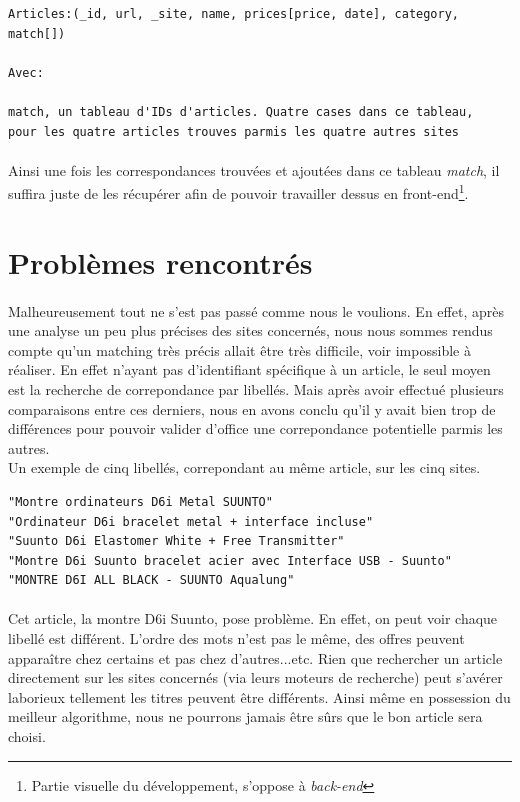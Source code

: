 \documentclass{report}
\begin{document}
\begin{lstlisting}
Articles:(_id, url, _site, name, prices[price, date], category, match[])

Avec:

match, un tableau d'IDs d'articles. Quatre cases dans ce tableau, 
pour les quatre articles trouves parmis les quatre autres sites

\end{lstlisting}

\paragraph{}
Ainsi une fois les correspondances trouvées et ajoutées dans ce tableau \textit{match}, il suffira juste de les récupérer afin de pouvoir travailler dessus en front-end\footnote{Partie visuelle du développement, s'oppose à \textit{back-end}}.


\section{Problèmes rencontrés}

\paragraph{}
Malheureusement tout ne s'est pas passé comme nous le voulions. En effet, après une analyse un peu plus précises des sites concernés, nous nous sommes rendus compte qu'un matching très précis allait être très difficile, voir impossible à réaliser. En effet n'ayant pas d'identifiant spécifique à un article, le seul moyen est la recherche de correpondance par libellés. Mais après avoir effectué plusieurs comparaisons entre ces derniers, nous en avons conclu qu'il y avait bien trop de différences pour pouvoir valider d'office une correpondance potentielle parmis les autres.\\
Un exemple de cinq libellés, correpondant au même article, sur les cinq sites.

\begin{lstlisting}
"Montre ordinateurs D6i Metal SUUNTO"
"Ordinateur D6i bracelet metal + interface incluse"
"Suunto D6i Elastomer White + Free Transmitter"
"Montre D6i Suunto bracelet acier avec Interface USB - Suunto"
"MONTRE D6I ALL BLACK - SUUNTO Aqualung"
\end{lstlisting}

\paragraph{}
Cet article, la montre D6i Suunto, pose problème. En effet, on peut voir chaque libellé est différent. L'ordre des mots n'est pas le même, des offres peuvent apparaître chez certains et pas chez d'autres...etc. Rien que rechercher un article directement sur les sites concernés (via leurs moteurs de recherche) peut s'avérer laborieux tellement les titres peuvent être différents. Ainsi même en possession du meilleur algorithme, nous ne pourrons jamais être sûrs que le bon article sera choisi.
\end{document}
